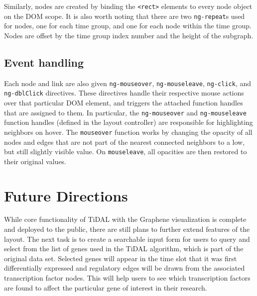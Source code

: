 Similarly, nodes are created by binding the \texttt{<rect>} elements to every node object on the DOM scope.
It is also worth noting that there are two \texttt{ng-repeat}s used for nodes, one for each time group, and one for each node within the time group.
Nodes are offset by the time group index number and the height of the subgraph.

\subsection{Event handling}
Each node and link are also given \texttt{ng-mouseover}, \texttt{ng-mouseleave}, \texttt{ng-click}, and \texttt{ng-dblClick} directives.
These directives handle their respective mouse actions over that particular DOM element, and triggers the attached function handles that are assigned to them.
In particular, the \texttt{ng-mouseover} and \texttt{ng-mouseleave} function handles (defined in the layout controller) are responsible for highlighting neighbors on hover.
The \texttt{mouseover} function works by changing the opacity of all nodes and edges that are not part of the nearest connected neighbors to a low, but still slightly visible value.
On \texttt{mouseleave}, all opacities are then restored to their original values.

\section{Future Directions}
While core functionality of TiDAL with the Graphene visualization is complete and deployed to the public, there are still plans to further extend features of the layout.
The next task is to create a searchable input form for users to query and select from the list of genes used in the TiDAL algorithm, which is part of the original data set.
Selected genes will appear in the time slot that it was first differentially expressed and regulatory edges will be drawn from the associated transcription factor nodes.
This will help users to see which transcription factors are found to affect the particular gene of interest in their research.

